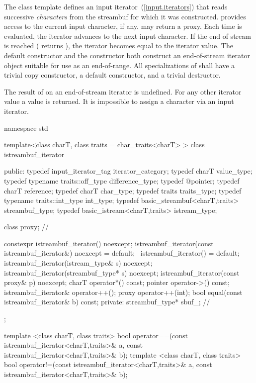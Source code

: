 \pnum
The
class template
defines an input iterator~(\ref{input.iterators}) that
reads successive
\textit{characters}
from the streambuf for which it was constructed.
provides access to the current input character, if any.
\enternote {} may return a proxy. \exitnote
Each time
is evaluated, the iterator advances to the next input character.
If the end of stream is reached ( returns
),
the iterator becomes equal to the
iterator value.
The default constructor
and the constructor
both construct an end-of-stream iterator object suitable for use
as an end-of-range.
All specializations of  shall have a trivial copy
constructor, a  default constructor, and a trivial destructor.

\pnum
The result of
on an end-of-stream iterator is undefined.
%
For any other iterator value a
value is returned.
It is impossible to assign a character via an input iterator.

%
\begin{codeblock}
namespace std {
  template<class charT, class traits = char_traits<charT> >
  class istreambuf_iterator {
  public:
    typedef input_iterator_tag            iterator_category;
    typedef charT                         value_type;
    typedef typename traits::off_type     difference_type;
    typedef @\unspecaligned@              pointer;
    typedef charT                         reference;
    typedef charT                         char_type;
    typedef traits                        traits_type;
    typedef typename traits::int_type     int_type;
    typedef basic_streambuf<charT,traits> streambuf_type;
    typedef basic_istream<charT,traits>   istream_type;

    class proxy;                          // \expos

    constexpr istreambuf_iterator() noexcept;
    istreambuf_iterator(const istreambuf_iterator&) noexcept = default;
    ~istreambuf_iterator() = default;
    istreambuf_iterator(istream_type& s) noexcept;
    istreambuf_iterator(streambuf_type* s) noexcept;
    istreambuf_iterator(const proxy& p) noexcept;
    charT operator*() const;
    pointer operator->() const;
    istreambuf_iterator& operator++();
    proxy operator++(int);
    bool equal(const istreambuf_iterator& b) const;
  private:
    streambuf_type* sbuf_;                // \expos
  };

  template <class charT, class traits>
    bool operator==(const istreambuf_iterator<charT,traits>& a,
            const istreambuf_iterator<charT,traits>& b);
  template <class charT, class traits>
    bool operator!=(const istreambuf_iterator<charT,traits>& a,
            const istreambuf_iterator<charT,traits>& b);
}
\end{codeblock}


